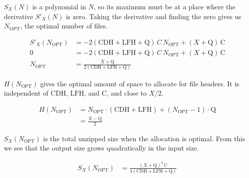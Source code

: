 \documentclass[letterpaper,twocolumn,10pt]{article}
\newcommand{\CDH}{\mathrm{CDH}}
\newcommand{\LFH}{\mathrm{LFH}}
\newcommand{\Q}{\mathrm{Q}}
\newcommand{\C}{\mathrm{C}}
\newcommand{\OPT}{\mathrm{OPT}}
\begin{document}
$S_X(N)$
is a polynomial in $N$,
so its maximum must be at a place where the derivative
$S'_X(N)$
is zero.
Taking the derivative and finding the zero gives us
$N_\OPT$,
the optimal number of files.

\begin{align*}
S'_X(N_\OPT) &= - 2 (\CDH + \LFH + \Q) \, C \, N_\OPT + (X + \Q) \, \C \\
           0 &= - 2 (\CDH + \LFH + \Q) \, C \, N_\OPT + (X + \Q) \, \C \\
     N_\OPT  &= \frac{X + \Q}{2 (\CDH + \LFH + \Q)}
\end{align*}

$H(N_\OPT)$
gives the optimal amount of space to allocate for file headers.
It is independent of $\CDH$, $\LFH$, and $\C$,
and close to $X/2$.

\begin{align*}
H(N_\OPT) &= N_\OPT\cdot(\CDH + \LFH) + (N_\OPT - 1)\cdot\Q \\
          &= \frac{X - \Q}{2}
\end{align*}

$S_X(N_\OPT)$
is the total unzipped size
when the allocation is optimal.
From this we see that the output size grows quadratically
in the input size.

\begin{align}
\label{eq:opt}
S_X(N_\OPT) &= \frac{(X + \Q)^2 \, \C}{4(\CDH + \LFH + \Q)}
\end{align}
\end{document}
